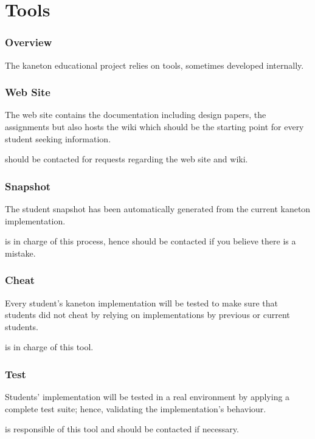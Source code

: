 %
%

\section{Tools}


\begin{frame}
  \frametitle{Overview}

  The kaneton educational project relies on tools, sometimes developed
  internally.
\end{frame}


\begin{frame}
  \frametitle{Web Site}

  The web site contains the documentation including design papers,
  the assignments \etc{} but also hosts the wiki which should be
  the starting point for every student seeking information.

  \-

   should be contacted for requests regarding the
  web site and wiki.
\end{frame}


\begin{frame}
  \frametitle{Snapshot}

  The student snapshot has been automatically generated from the current
  kaneton implementation.

  \-

   is in charge of this process, hence should be
  contacted if you believe there is a mistake.
\end{frame}


\begin{frame}
  \frametitle{Cheat}

  Every student's kaneton implementation will be tested to make sure that
  students did not cheat by relying on implementations by previous or
  current students.

  \-

   is in charge of this tool.
\end{frame}


\begin{frame}
  \frametitle{Test}

  Students' implementation will be tested in a real environment by applying
  a complete test suite; hence, validating the implementation's behaviour.

  \-

   is responsible of this tool and should be contacted
  if necessary.
\end{frame}

